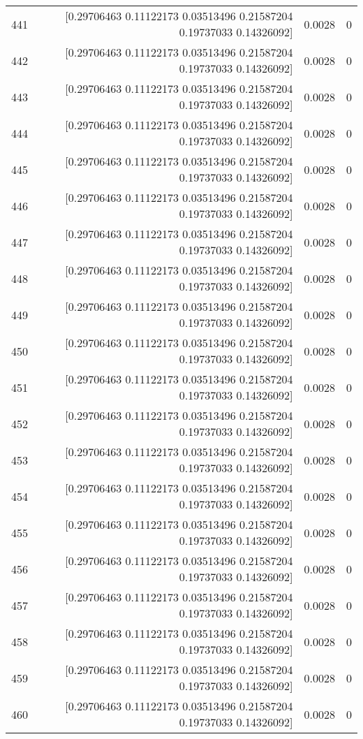 \begin{longtable}{lrrr}
441 & [0.29706463 0.11122173 0.03513496 0.21587204 0.19737033 0.14326092] & 0.0028 & 0 \\
442 & [0.29706463 0.11122173 0.03513496 0.21587204 0.19737033 0.14326092] & 0.0028 & 0 \\
443 & [0.29706463 0.11122173 0.03513496 0.21587204 0.19737033 0.14326092] & 0.0028 & 0 \\
444 & [0.29706463 0.11122173 0.03513496 0.21587204 0.19737033 0.14326092] & 0.0028 & 0 \\
445 & [0.29706463 0.11122173 0.03513496 0.21587204 0.19737033 0.14326092] & 0.0028 & 0 \\
446 & [0.29706463 0.11122173 0.03513496 0.21587204 0.19737033 0.14326092] & 0.0028 & 0 \\
447 & [0.29706463 0.11122173 0.03513496 0.21587204 0.19737033 0.14326092] & 0.0028 & 0 \\
448 & [0.29706463 0.11122173 0.03513496 0.21587204 0.19737033 0.14326092] & 0.0028 & 0 \\
449 & [0.29706463 0.11122173 0.03513496 0.21587204 0.19737033 0.14326092] & 0.0028 & 0 \\
450 & [0.29706463 0.11122173 0.03513496 0.21587204 0.19737033 0.14326092] & 0.0028 & 0 \\
451 & [0.29706463 0.11122173 0.03513496 0.21587204 0.19737033 0.14326092] & 0.0028 & 0 \\
452 & [0.29706463 0.11122173 0.03513496 0.21587204 0.19737033 0.14326092] & 0.0028 & 0 \\
453 & [0.29706463 0.11122173 0.03513496 0.21587204 0.19737033 0.14326092] & 0.0028 & 0 \\
454 & [0.29706463 0.11122173 0.03513496 0.21587204 0.19737033 0.14326092] & 0.0028 & 0 \\
455 & [0.29706463 0.11122173 0.03513496 0.21587204 0.19737033 0.14326092] & 0.0028 & 0 \\
456 & [0.29706463 0.11122173 0.03513496 0.21587204 0.19737033 0.14326092] & 0.0028 & 0 \\
457 & [0.29706463 0.11122173 0.03513496 0.21587204 0.19737033 0.14326092] & 0.0028 & 0 \\
458 & [0.29706463 0.11122173 0.03513496 0.21587204 0.19737033 0.14326092] & 0.0028 & 0 \\
459 & [0.29706463 0.11122173 0.03513496 0.21587204 0.19737033 0.14326092] & 0.0028 & 0 \\
460 & [0.29706463 0.11122173 0.03513496 0.21587204 0.19737033 0.14326092] & 0.0028 & 0 \\

\end{longtable}
